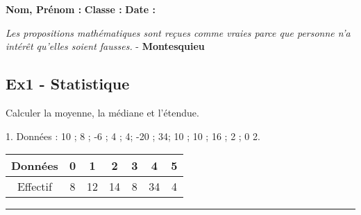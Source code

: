 \documentclass[11pt]{article}
\newcommand{\horrule}[1]{\rule{\linewidth}{#1}} %
\begin{document}

\newtheorem{Definition}{Définition}
\newtheorem{Theorem}{Théorème}
\newtheorem{Proposition}{Propriété}

\renewcommand{\labelitemi}{$\bullet$}
\renewcommand{\labelitemii}{$\circ$}

\setlength{\columnseprule}{1pt}

\textbf{Nom, Prénom :} \hspace{8cm} \textbf{Classe :} \hspace{3cm} \textbf{Date :}\\
\vspace{-0.8cm}
\begin{center}
  \textit{Les propositions mathématiques sont reçues comme vraies parce que personne n'a intérêt qu'elles soient fausses.}  - \textbf{Montesquieu}
\end{center}
\vspace{-0.8cm}

\subsection*{Ex1 - Statistique}
Calculer la moyenne, la médiane et l'étendue.
\begin{multicols}{2}
  1. Données : 10 ; 8 ; -6 ; 4 ; 4; -20 ; 34; 10 ; 10 ; 16 ; 2 ; 0
  2.\begin{tabular}{|c|c|c|c|c|c|c|}
      \hline
      Données  & 0 & 1 & 2 & 3 & 4 & 5 \\  \hline
      Effectif & 8  & 12  & 14  & 8  & 34  & 4 \\  \hline
    \end{tabular}
  \end{multicols}

  \horrule{1px}
\end{document}
